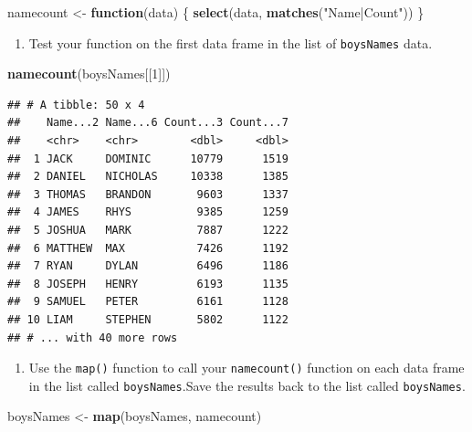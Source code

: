 \documentclass[
]{book}
\newenvironment{Shaded}{\begin{snugshade}}{\end{snugshade}}
\newcommand{\ControlFlowTok}[1]{\textcolor[rgb]{0.13,0.29,0.53}{\textbf{#1}}}
\newcommand{\DecValTok}[1]{\textcolor[rgb]{0.00,0.00,0.81}{#1}}
\newcommand{\KeywordTok}[1]{\textcolor[rgb]{0.13,0.29,0.53}{\textbf{#1}}}
\newcommand{\NormalTok}[1]{#1}
\newcommand{\StringTok}[1]{\textcolor[rgb]{0.31,0.60,0.02}{#1}}
\providecommand{\tightlist}{%
  \setlength{\itemsep}{0pt}\setlength{\parskip}{0pt}}
\begin{document}
\begin{Shaded}
\begin{Highlighting}[]
\NormalTok{  namecount \textless{}{-}}\StringTok{ }\ControlFlowTok{function}\NormalTok{(data) \{}
      \KeywordTok{select}\NormalTok{(data, }\KeywordTok{matches}\NormalTok{(}\StringTok{"Name|Count"}\NormalTok{))}
\NormalTok{  \}}
\end{Highlighting}
\end{Shaded}

\begin{enumerate}
\def\labelenumi{\arabic{enumi}.}
\setcounter{enumi}{1}
\tightlist
\item
  Test your function on the first data frame in the list of \texttt{boysNames} data.
\end{enumerate}

\begin{Shaded}
\begin{Highlighting}[]
  \KeywordTok{namecount}\NormalTok{(boysNames[[}\DecValTok{1}\NormalTok{]])}
\end{Highlighting}
\end{Shaded}

\begin{verbatim}
## # A tibble: 50 x 4
##    Name...2 Name...6 Count...3 Count...7
##    <chr>    <chr>        <dbl>     <dbl>
##  1 JACK     DOMINIC      10779      1519
##  2 DANIEL   NICHOLAS     10338      1385
##  3 THOMAS   BRANDON       9603      1337
##  4 JAMES    RHYS          9385      1259
##  5 JOSHUA   MARK          7887      1222
##  6 MATTHEW  MAX           7426      1192
##  7 RYAN     DYLAN         6496      1186
##  8 JOSEPH   HENRY         6193      1135
##  9 SAMUEL   PETER         6161      1128
## 10 LIAM     STEPHEN       5802      1122
## # ... with 40 more rows
\end{verbatim}

\begin{enumerate}
\def\labelenumi{\arabic{enumi}.}
\setcounter{enumi}{2}
\tightlist
\item
  Use the \texttt{map()} function to call your \texttt{namecount()} function on each data frame in the list called \texttt{boysNames}.Save the results back to the list called \texttt{boysNames}.
\end{enumerate}

\begin{Shaded}
\begin{Highlighting}[]
\NormalTok{  boysNames \textless{}{-}}\StringTok{ }\KeywordTok{map}\NormalTok{(boysNames, namecount)}
\end{Highlighting}
\end{Shaded}
\end{document}
